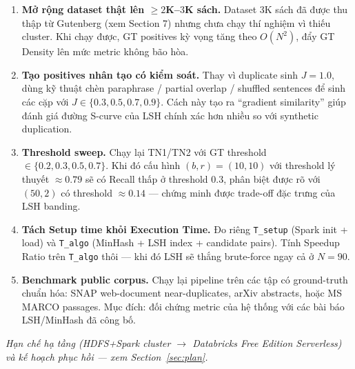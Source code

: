 \begin{enumerate}
    \item \textbf{Mở rộng dataset thật lên $\geq 2$K--$3$K sách.} Dataset 3K sách đã được thu thập từ Gutenberg (xem Section 7) nhưng chưa chạy thí nghiệm vì thiếu cluster. Khi chạy được, GT positives kỳ vọng tăng theo $O(N^2)$, đẩy GT Density lên mức metric không bão hòa.

    \item \textbf{Tạo positives nhân tạo có kiểm soát.} Thay vì duplicate sinh $J = 1.0$, dùng kỹ thuật chèn paraphrase / partial overlap / shuffled sentences để sinh các cặp với $J \in \{0.3, 0.5, 0.7, 0.9\}$. Cách này tạo ra ``gradient similarity'' giúp đánh giá đường S-curve của LSH chính xác hơn nhiều so với synthetic duplication.

    \item \textbf{Threshold sweep.} Chạy lại TN1/TN2 với GT threshold $\in \{0.2, 0.3, 0.5, 0.7\}$. Khi đó cấu hình $(b, r) = (10, 10)$ với threshold lý thuyết $\approx 0.79$ sẽ có Recall thấp ở threshold $0.3$, phân biệt được rõ với $(50, 2)$ có threshold $\approx 0.14$ --- chứng minh được trade-off đặc trưng của LSH banding.

    \item \textbf{Tách Setup time khỏi Execution Time.} Đo riêng \texttt{T\_setup} (Spark init + load) và \texttt{T\_algo} (MinHash + LSH index + candidate pairs). Tính Speedup Ratio trên \texttt{T\_algo} thôi --- khi đó LSH sẽ thắng brute-force ngay cả ở $N = 90$.

    \item \textbf{Benchmark public corpus.} Chạy lại pipeline trên các tập có ground-truth chuẩn hóa: SNAP web-document near-duplicates, arXiv abstracts, hoặc MS MARCO passages. Mục đích: đối chứng metric của hệ thống với các bài báo LSH/MinHash đã công bố.
\end{enumerate}

\textit{Hạn chế hạ tầng (HDFS+Spark cluster $\rightarrow$ Databricks Free Edition Serverless) và kế hoạch phục hồi --- xem Section~\ref{sec:plan}.}
